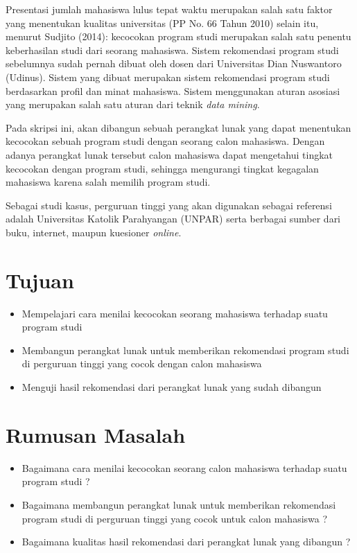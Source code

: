 \documentclass[a4paper,twoside]{article}
\begin{document}
Presentasi jumlah mahasiswa lulus tepat waktu merupakan salah satu faktor yang menentukan kualitas universitas (PP No. 66 Tahun 2010) selain itu, menurut Sudjito (2014): kecocokan program studi merupakan salah satu penentu keberhasilan studi dari seorang mahasiswa. Sistem rekomendasi program studi sebelumnya sudah pernah dibuat oleh dosen dari Universitas Dian Nuswantoro (Udinus). Sistem yang dibuat merupakan sistem rekomendasi program studi berdasarkan profil dan minat mahasiswa. Sistem menggunakan aturan asosiasi yang merupakan salah satu aturan dari teknik \textit{data mining}.  

Pada skripsi ini, akan dibangun sebuah perangkat lunak yang dapat menentukan kecocokan sebuah program studi dengan seorang calon mahasiswa. Dengan adanya perangkat lunak tersebut calon mahasiswa dapat mengetahui tingkat kecocokan dengan program studi, sehingga mengurangi tingkat kegagalan mahasiswa karena salah memilih program studi.

Sebagai studi kasus, perguruan tinggi yang akan digunakan sebagai referensi adalah Universitas Katolik Parahyangan (UNPAR) serta berbagai sumber dari buku, internet, maupun kuesioner \textit{online}.


\section{Tujuan}

\begin{itemize}
	\item Mempelajari cara menilai kecocokan seorang mahasiswa terhadap suatu program studi
	\item Membangun perangkat lunak untuk memberikan rekomendasi program studi di perguruan tinggi yang cocok dengan calon mahasiswa
	\item Menguji hasil rekomendasi dari perangkat lunak yang sudah dibangun
\end{itemize}

\section{Rumusan Masalah}

\begin{itemize}
	\item Bagaimana cara menilai kecocokan seorang calon mahasiswa terhadap suatu program studi ?
	\item Bagaimana membangun perangkat lunak untuk memberikan rekomendasi program studi di perguruan tinggi yang cocok untuk calon mahasiswa ?
	\item Bagaimana kualitas hasil rekomendasi dari perangkat lunak yang dibangun ?
\end{itemize}
\end{document}
